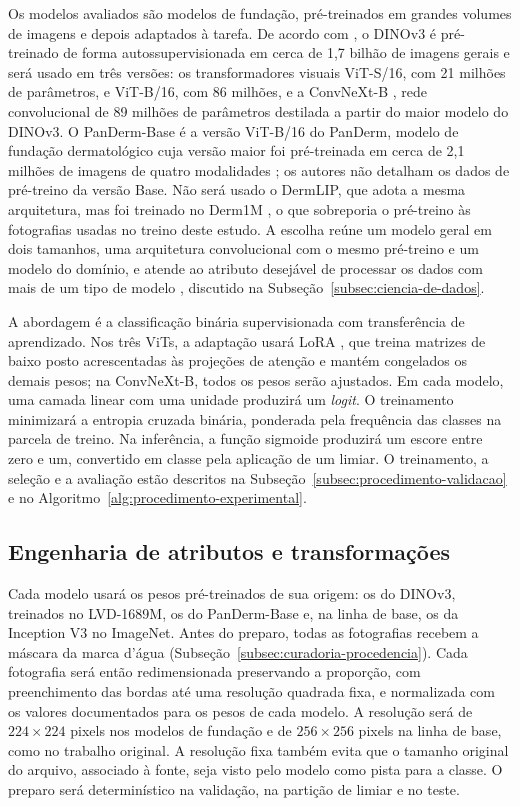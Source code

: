 Os modelos avaliados são modelos de fundação, pré-treinados em grandes
volumes de imagens e depois adaptados à tarefa. De acordo com , o DINOv3 é pré-treinado de forma autossupervisionada em
cerca de 1,7 bilhão de imagens gerais e será usado em três versões: os
transformadores visuais ViT-S/16, com 21 milhões de
parâmetros, e ViT-B/16, com 86 milhões, e a ConvNeXt-B
\cite{liu2022convnext}, rede convolucional de 89 milhões de parâmetros
destilada a partir do maior modelo do DINOv3. O PanDerm-Base é a
versão ViT-B/16 do PanDerm, modelo de fundação dermatológico cuja versão
maior foi pré-treinada em cerca de 2,1 milhões de imagens de quatro
modalidades \cite{yan2025panderm}; os autores não detalham os dados de
pré-treino da versão Base. Não será usado o DermLIP, que adota a mesma
arquitetura, mas foi treinado no Derm1M \cite{yan2025derm1m}, o que sobreporia o
pré-treino às fotografias usadas no treino deste estudo. A escolha reúne um modelo geral em dois
tamanhos, uma arquitetura convolucional com o mesmo pré-treino e um modelo
do domínio, e atende ao atributo desejável de processar os dados com mais
de um tipo de modelo \cite{ghotra2015}, discutido na
Subseção~\ref{subsec:ciencia-de-dados}.

A abordagem é a classificação binária supervisionada com transferência de
aprendizado. Nos três ViTs, a adaptação usará LoRA \cite{hu2022lora}, que
treina matrizes de baixo posto acrescentadas às projeções de atenção e
mantém congelados os demais pesos; na ConvNeXt-B, todos os pesos serão
ajustados. Em cada modelo, uma camada linear com uma unidade produzirá um
\textit{logit}. O
treinamento minimizará a entropia cruzada binária, ponderada pela
frequência das classes na parcela de treino. Na inferência, a função
sigmoide produzirá um escore entre zero e um, convertido em classe pela
aplicação de um limiar. O treinamento, a seleção e a avaliação estão
descritos na Subseção~\ref{subsec:procedimento-validacao} e no
Algoritmo~\ref{alg:procedimento-experimental}.

\subsection{Engenharia de atributos e transformações}
\label{subsec:preprocessamento-arquiteturas}

Cada modelo usará os pesos pré-treinados de sua origem: os do DINOv3,
treinados no LVD-1689M, os do PanDerm-Base e, na linha de base, os da
Inception V3 no ImageNet. Antes do preparo, todas as fotografias recebem a
máscara da marca d'água (Subseção~\ref{subsec:curadoria-procedencia}). Cada
fotografia será então redimensionada preservando a proporção, com
preenchimento das bordas até uma resolução quadrada fixa, e normalizada com
os valores documentados para os pesos de cada modelo. A resolução será de
$224 \times 224$ pixels nos modelos de fundação e de $256 \times 256$ pixels
na linha de base, como no trabalho original.
A resolução fixa também evita que o tamanho original do arquivo, associado
à fonte, seja visto pelo modelo como pista para a classe. O preparo será
determinístico na validação, na partição de limiar e no teste.

